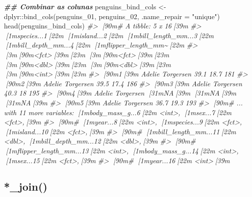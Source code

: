 \documentclass[
]{book}
\newenvironment{Shaded}{\begin{snugshade}}{\end{snugshade}}
\newcommand{\AttributeTok}[1]{\textcolor[rgb]{0.61,0.61,0.61}{#1}}
\newcommand{\CommentTok}[1]{\textcolor[rgb]{0.37,0.37,0.37}{\textit{#1}}}
\newcommand{\DocumentationTok}[1]{\textcolor[rgb]{0.37,0.37,0.37}{\textbf{\textit{#1}}}}
\newcommand{\FunctionTok}[1]{\textcolor[rgb]{0,0,0}{#1}}
\newcommand{\NormalTok}[1]{#1}
\newcommand{\OtherTok}[1]{\textcolor[rgb]{0.37,0.37,0.37}{#1}}
\newcommand{\SpecialCharTok}[1]{\textcolor[rgb]{0,0,0}{#1}}
\newcommand{\StringTok}[1]{\textcolor[rgb]{0.5,0.5,0.5}{#1}}
\begin{document}
\begin{Shaded}
\begin{Highlighting}[]
\DocumentationTok{\#\# Combinar as colunas}
\NormalTok{penguins\_bind\_cols }\OtherTok{\textless{}{-}}\NormalTok{ dplyr}\SpecialCharTok{::}\FunctionTok{bind\_cols}\NormalTok{(penguins\_01, penguins\_02, }\AttributeTok{.name\_repair =} \StringTok{"unique"}\NormalTok{)}
\FunctionTok{head}\NormalTok{(penguins\_bind\_cols)}
\CommentTok{\#\textgreater{} [90m\# A tibble: 5 x 16[39m}
\CommentTok{\#\textgreater{}   [1mspecies...1[22m [1misland...2[22m [1mbill\_length\_mm...3[22m [1mbill\_depth\_mm...4[22m [1mflipper\_length\_mm\textasciitilde{}[22m}
\CommentTok{\#\textgreater{}   [3m[90m\textless{}fct\textgreater{}[39m[23m       [3m[90m\textless{}fct\textgreater{}[39m[23m                   [3m[90m\textless{}dbl\textgreater{}[39m[23m             [3m[90m\textless{}dbl\textgreater{}[39m[23m              [3m[90m\textless{}int\textgreater{}[39m[23m}
\CommentTok{\#\textgreater{} [90m1[39m Adelie      Torgersen                39.1              18.7                181}
\CommentTok{\#\textgreater{} [90m2[39m Adelie      Torgersen                39.5              17.4                186}
\CommentTok{\#\textgreater{} [90m3[39m Adelie      Torgersen                40.3              18                  195}
\CommentTok{\#\textgreater{} [90m4[39m Adelie      Torgersen                [31mNA[39m                [31mNA[39m                   [31mNA[39m}
\CommentTok{\#\textgreater{} [90m5[39m Adelie      Torgersen                36.7              19.3                193}
\CommentTok{\#\textgreater{} [90m\# ... with 11 more variables: [1mbody\_mass\_g...6[22m \textless{}int\textgreater{}, [1msex...7[22m \textless{}fct\textgreater{},[39m}
\CommentTok{\#\textgreater{} [90m\#   [1myear...8[22m \textless{}int\textgreater{}, [1mspecies...9[22m \textless{}fct\textgreater{}, [1misland...10[22m \textless{}fct\textgreater{},[39m}
\CommentTok{\#\textgreater{} [90m\#   [1mbill\_length\_mm...11[22m \textless{}dbl\textgreater{}, [1mbill\_depth\_mm...12[22m \textless{}dbl\textgreater{},[39m}
\CommentTok{\#\textgreater{} [90m\#   [1mflipper\_length\_mm...13[22m \textless{}int\textgreater{}, [1mbody\_mass\_g...14[22m \textless{}int\textgreater{}, [1msex...15[22m \textless{}fct\textgreater{},[39m}
\CommentTok{\#\textgreater{} [90m\#   [1myear...16[22m \textless{}int\textgreater{}[39m}
\end{Highlighting}
\end{Shaded}

\hypertarget{join}{%
\subsection{*\_join()}\label{join}}
\end{document}
